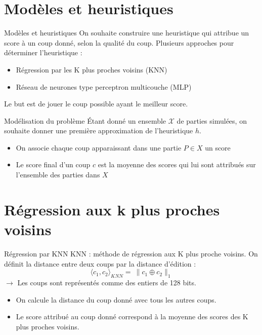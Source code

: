 \documentclass{beamer}
\begin{document}
{\section{Modèles et heuristiques}}

\begin{frame}{Modèles et heuristiques}
    On souhaite construire une heuristique qui attribue un \alert{score} à un coup donné, selon la \alert{qualité} du coup.
    Plusieurs approches pour déterminer l'heuristique :
    \begin{itemize}
        \item Régression par les K plus proches voisins (KNN)
        \item Réseau de neurones type perceptron multicouche (MLP)
    \end{itemize}
    Le but est de jouer le coup possible ayant le meilleur score.
\end{frame}

\begin{frame}{Modélisation du problème}
    Étant donné un ensemble $\mathcal{X}$ de parties simulées,
    on souhaite donner une première approximation de l'heuristique $h$.
    \begin{itemize}
        \item On associe chaque coup apparaissant dans une partie $P \in X$ un score
        \item Le score final d'un coup $c$ est la moyenne des scores qui lui sont attribués sur l'ensemble des parties dans $X$
    \end{itemize}
\end{frame}

{\section{Régression aux k plus proches voisins}}

\begin{frame}{Régression par KNN}
    KNN : méthode de régression aux \alert{K plus proche voisins}.
    On définit la distance entre deux coups par la \alert{distance d'édition} :
    $$ \langle c_1, c_2 \rangle_{KNN} = \ \rVert c_1 \oplus c_2 \lVert_1 $$
    $\rightarrow$ Les coups sont représentés comme des entiers de 128 bits.
    \begin{itemize}
        \item On calcule la distance du coup donné avec tous les autres coups.
        \item Le score attribué au coup donné correspond à \alert{la moyenne des scores} des K plus proches voisins.
    \end{itemize}
\end{frame}
\end{document}
